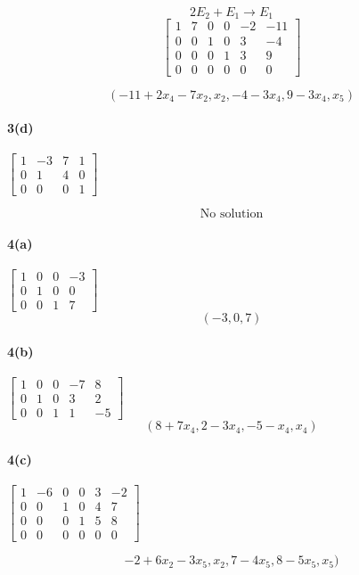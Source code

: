 \documentclass[a4paper,11pt,twoside]{report}
\begin{document}
\[2E_2 + E_1 \to E_1\]
\[\begin{bmatrix} 1 & 7 & 0 & 0 & -2 & -11 \\ 0 & 0 & 1 & 0 & 3 & -4 \\ 0 & 0 & 0 & 1 & 3 & 9 \\ 0 & 0 & 0 & 0 & 0 & 0 \end{bmatrix} \]

\[\boxed{(-11+2x_4-7x_2, x_2, -4 -3x_4, 9-3x_4, x_5)}\]

\paragraph{3(d)}
$\begin{bmatrix} 1 & -3 & 7 & 1 \\ 0 & 1 & 4 & 0 \\ 0 & 0 & 0 & 1  \end{bmatrix} $

\[\boxed{\:\text{No solution}\:}\]

\paragraph{4(a)}
$\begin{bmatrix} 1 & 0 & 0 & -3 \\ 0 & 1 & 0 & 0 \\ 0 & 0 & 1 & 7 \end{bmatrix} $
\[\boxed{(-3, 0, 7)}\]

\paragraph{4(b)}
$\begin{bmatrix} 1 & 0 & 0 & -7 & 8 \\ 0 & 1 & 0 & 3 & 2 \\ 0 & 0 & 1 & 1 & -5 \end{bmatrix} $
\[\boxed{(8+7x_4, 2 - 3x_4, -5 - x_4, x_4)}\]

\paragraph{4(c)}
$\begin{bmatrix} 1 & -6 & 0 & 0 & 3 & -2 \\ 0 & 0 & 1 & 0 & 4 & 7 \\ 0 & 0 & 0 & 1 & 5 & 8 \\ 0 & 0 & 0 & 0 & 0 & 0 \end{bmatrix} $

\[\boxed{-2 + 6x_2 -3 x_5, x_2, 7 - 4x_5, 8 - 5x_5, x_5)}\]
\end{document}
